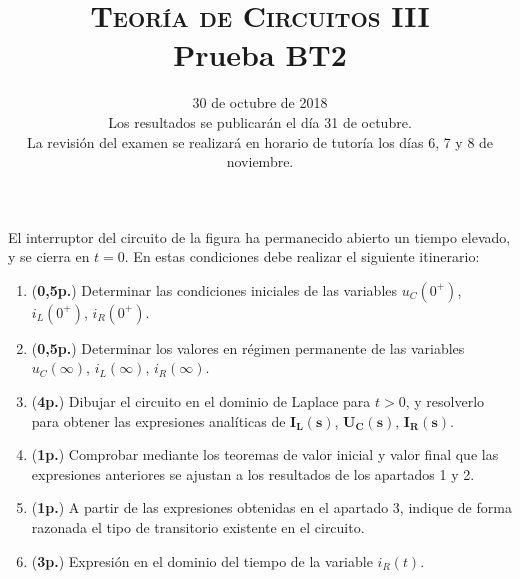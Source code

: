 \documentclass[12pt]{article}
\newcommand{\laplace}[1]{\mathbf{#1}(\mathbf{s})}
\begin{document}
\title{\textsc{Teoría de Circuitos III}\\Prueba BT2}

\date{30 de octubre de  2018\\\small{Los resultados se publicarán el día 31 de octubre.\\La revisión del examen se realizará en horario de tutoría los días 6, 7 y 8 de noviembre.}}

\maketitle

El interruptor del circuito de la figura ha permanecido abierto un tiempo elevado, y se cierra en $t = 0$. En estas condiciones debe realizar el siguiente itinerario:

\begin{enumerate}
\item (\textbf{0,5p.}) Determinar las condiciones iniciales de las variables $u_C(0^+)$, $i_L(0^+)$, $i_R(0^+)$.
\item (\textbf{0,5p.}) Determinar los valores en régimen permanente de las variables $u_C(\infty)$, $i_L(\infty)$, $i_R(\infty)$.
\item (\textbf{4p.}) Dibujar el circuito en el dominio de Laplace para $t > 0$, y resolverlo para obtener las expresiones analíticas de $\laplace{I_L}$, $\laplace{U_C}$, $\laplace{I_R}$.
\item (\textbf{1p.}) Comprobar mediante los teoremas de valor inicial y valor final que las expresiones anteriores se ajustan a los resultados de los apartados 1 y 2.

\item (\textbf{1p.}) A partir de las expresiones obtenidas en el apartado 3, indique de forma razonada el tipo de transitorio existente en el circuito.

\item (\textbf{3p.}) Expresión en el dominio del tiempo de la variable $i_R(t)$.
\end{enumerate}
\end{document}
